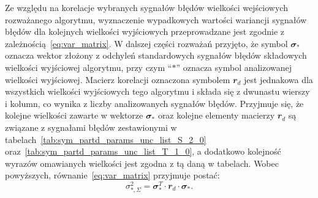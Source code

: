 Ze względu na korelacje wybranych sygnałów błędów wielkości wejściowych rozważanego algorytmu, wyznaczenie wypadkowych wartości wariancji sygnałów błędów dla kolejnych wielkości wyjściowych przeprowadzane jest zgodnie z zależnością~\eqref{eq:var_matrix}. W dalszej części rozważań przyjęto, że symbol $\mathbfit{\sigma}_{*}$ oznacza wektor złożony z odchyleń standardowych sygnałów błędów składowych wielkości wyjściowej algorytmu, przy czym \enquote{$*$} oznacza symbol analizowanej wielkości wyjściowej. Macierz korelacji oznaczona symbolem $\mathbfit{r}_{d}$ jest jednakowa dla wszystkich wielkości wyjściowych tego algorytmu i składa się z dwunastu wierszy i kolumn, co wynika z liczby analizowanych sygnałów błędów. Przyjmuje się, że kolejne wielkości zawarte w wektorze $\mathbfit{\sigma}_{*}$ oraz kolejne elementy macierzy $\mathbfit{r}_{d}$ są związane z sygnałami błędów zestawionymi w tabelach~\ref{tab:sym_partd_params_unc_list_S_2_0} oraz~\ref{tab:sym_partd_params_unc_list_T_1_0}, a dodatkowo kolejność wyrazów omawianych wielkości jest zgodna z tą daną w tabelach. Wobec powyższych, równanie~\eqref{eq:var_matrix} przyjmuje postać:
\begin{equation}
\sigma_{*,\Sigma}^{2} = \mathbfit{\sigma}_{*}^{T} \cdot \mathbfit{r}_{d} \cdot \mathbfit{\sigma}_{*} \label{eq:sym_partd_output_varmat_list}.
\end{equation}

